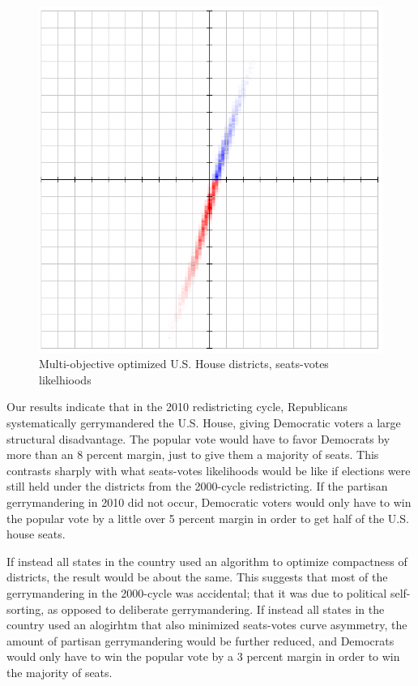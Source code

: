 \documentclass[preprint,12pt]{article}
\begin{document}
\begin{figure}[htb!]
    \begin{center}
        \includegraphics[scale=0.5]{Figures/original_method/SM__ush.png}
        \caption{Multi-objective optimized U.S. House districts, seats-votes likelhioods}\label{fig:SM_ush}
    \end{center}
\end{figure}

Our results indicate that in the 2010 redistricting cycle, Republicans systematically gerrymandered the U.S. House, giving Democratic voters a large structural disadvantage. The popular vote would have to favor Democrats by more than an 8 percent margin, just to give them a majority of seats.  This contrasts sharply with what seats-votes likelihoods would be like if elections were still held under the districts from the 2000-cycle redistricting.  If the partisan gerrymandering in 2010 did not occur, Democratic voters would only have to win the popular vote by a little over 5 percent margin in order to get half of the U.S. house seats.

If instead all states in the country used an algorithm to optimize compactness of districts, the result would be about the same.  This suggests that most of the gerrymandering in the 2000-cycle was accidental; that it was due to political self-sorting, as opposed to deliberate gerrymandering.  If instead all states in the country used an alogirhtm that also minimized seats-votes curve asymmetry, the amount of partisan gerrymandering would be further reduced, and Democrats would only have to win the popular vote by a 3 percent margin in order to win the majority of seats.
\end{document}
